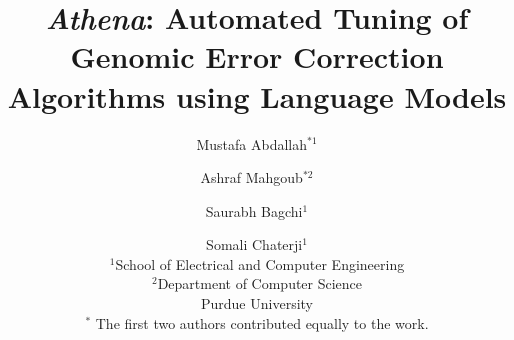\documentclass[11pt,letterpaper]{article}
\newcommand{\name}{{\sc Athena}\xspace}
\begin{document}
\thispagestyle{empty}

\title{\textit{\name}: Automated Tuning of Genomic Error Correction Algorithms using Language Models}


\author
{
\centering
Mustafa Abdallah$^{*1}$  \and Ashraf Mahgoub$^{*2}$ 
\and Saurabh Bagchi$^{1}$ \and Somali Chaterji$^{1}$ 
\\
		$^{1}$School of Electrical and Computer Engineering\\
	   	$^{2}$Department of Computer Science\\
                Purdue University\\
{\small $^*$ The first two authors contributed equally to the work.}
}

\date{}

\maketitle
\begin{abstract}
  
\end{abstract}


%













\end{document}
